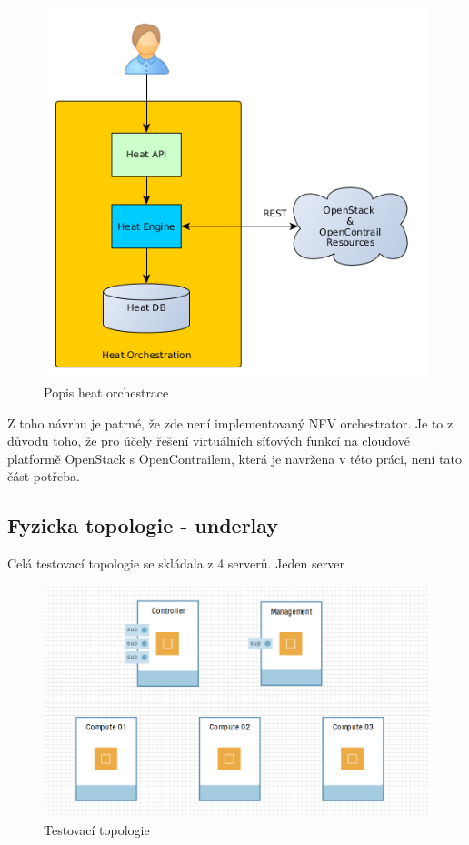 \begin{figure}[h]
\begin{centering}
\includegraphics[scale=0.41]{images/heat_engine}
\par\end{centering}
\caption{Popis heat orchestrace\label{fig:heat_engine}}
\end{figure}

Z toho návrhu je patrné, že zde není implementovaný NFV orchestrator. Je to z důvodu toho, že pro účely řešení virtuálních síťových funkcí na cloudové platformě OpenStack s OpenContrailem, která je navržena v této práci, není tato část potřeba.

\subsection{Fyzicka topologie - underlay}\label{sub:interaction}

Celá testovací topologie se skládala z 4 serverů. Jeden server

\begin{figure}[h]
\begin{centering}
\includegraphics[scale=0.41]{images/ravello_topologie}
\par\end{centering}
\caption{Testovací topologie\label{fig:ravello_topologie}}
\end{figure}


